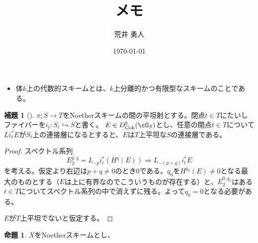 \documentclass[uplatex, a4paper, dvipdfmx]{jsarticle}
\title{メモ}
\author{荒井 勇人}
\date{\today}
\theoremstyle{definition}
\newtheorem{proposition}[theorem]{命題}
\newtheorem{lemma}[theorem]{補題}
\DeclareMathOperator{\Pic}{\mathrm{Pic}}
\DeclareMathOperator{\Coh}{\mathrm{Coh}}
\begin{document}
\maketitle

\begin{itemize}
    \item 体$k$上の代数的スキームとは、$k$上分離的かつ有限型なスキームのことである。
\end{itemize}

\begin{lemma}[{\cite[Lemma 4.3]{MR1651025}}]\label{lem:flatness}
    $\pi \colon S \to T$をNoetherスキームの間の平坦射とする。閉点$t \in T$にたいしファイバーを$i_t \colon S_t \hookrightarrow S$と書く。
    $E \in D_{\Coh}^b(\cO_S)$とし、任意の閉点$t \in T$について$Li_t^*E$が$S_t$上の連接層になるとすると、$E$は$T$上平坦な$S$の連接層である。
\end{lemma}
\begin{proof}
    スペクトル系列
    \begin{equation}
        E_2^{p,q} = L_{-p}i_t^*(H^q(E)) \Rightarrow L_{-(p+q)}i_t^*E
    \end{equation}
    を考える。仮定より右辺は$p + q \neq 0$のとき$0$である。$q_0$を$H^{q_0}(E) \neq 0$となる最大のものとする（$E$は上に有界なのでこういうものが存在する）と、$E_2^{0, q_0}$はある$t \in T$についてスペクトル系列の中で消えずに残る。よって$q_0 = 0$となる必要がある。

    $E$が$T$上平坦でないと仮定する。
\end{proof}


\begin{proposition}
    $X$をNoetherスキームとし、
\end{proposition}
\printbibliography[title=参考文献]
\end{document}
